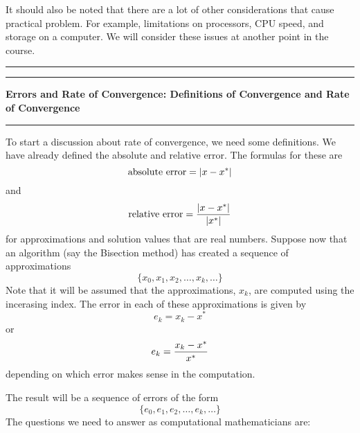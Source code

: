 \documentclass[10pt,fleqn]{article}
\begin{document}
It should also be noted that there are a lot of other considerations that
cause practical problem. For example, limitations on processors, CPU speed, 
and storage on a computer. We will consider these issues at another point in
the course. 
\vskip0.1in\hrule\vskip0.1in
\newpage
\vskip0.1in\hrule\vskip0.1in
\noindent
{\bf Errors and Rate of Convergence: Definitions of Convergence and Rate of
Convergence}
\vskip0.1in\hrule\vskip0.1in
\noindent
To start a discussion about rate of convergence, we need some definitions. We
have already defined the absolute and relative error. The formulas for these
are
$$
  \makebox{absolute error} = | x - x^* |
$$
and 
$$
  \makebox{relative error} = {{| x - x^* |}\over{|x^*|}}
$$
for approximations and solution values that are real numbers. Suppose now that
an algorithm (say the Bisection method) has created a sequence of approximations
$$
  \lbrace x_0, x_1, x_2, \ldots, x_k, \ldots \rbrace
$$
Note that it will be assumed that the approximations, $x_k$, are computed using
the incerasing index. The error in each of these approximations is given by
$$
  e_k = x_k - x^*
$$
or
$$
  e_k = {{ x_k - x^* }\over{x^*}}
$$
depending on which error makes sense in the computation.

The result will be a sequence of errors of the form
$$
  \lbrace e_0, e_1, e_2, \ldots, e_k, \ldots \rbrace
$$
The questions we need to answer as computational mathematicians are:
\end{document}
